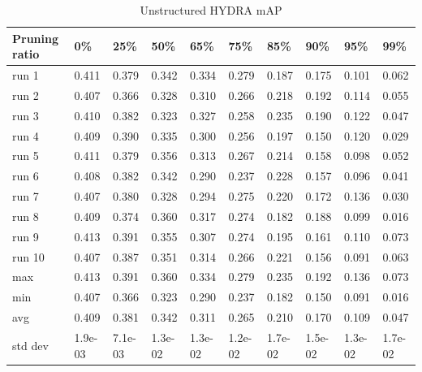 \documentclass[journal,onecolumn,12pt]{IEEEtran}
\begin{document}
\begin{table}[htbp]
    \caption{Unstructured HYDRA mAP}
    \begin{center}
    \begin{tabular}{ |p{2cm}|p{1cm}|p{1cm}|p{1cm}|p{1cm}|p{1cm}|p{1cm}|p{1cm}|p{1cm}|p{1cm}|  }
     \hline
     Pruning ratio  & 0\% & 25\%& 50\%& 65\%& 75\%& 85\%& 90\%& 95\%& 99\%\\
     \hline
        run 1&0.411&0.379&0.342&0.334&0.279&0.187&0.175&0.101&0.062\\
        run 2&0.407&0.366&0.328&0.310&0.266&0.218&0.192&0.114&0.055\\
        run 3&0.410&0.382&0.323&0.327&0.258&0.235&0.190&0.122&0.047\\
        run 4&0.409&0.390&0.335&0.300&0.256&0.197&0.150&0.120&0.029\\
        run 5&0.411&0.379&0.356&0.313&0.267&0.214&0.158&0.098&0.052\\
        run 6&0.408&0.382&0.342&0.290&0.237&0.228&0.157&0.096&0.041\\
        run 7&0.407&0.380&0.328&0.294&0.275&0.220&0.172&0.136&0.030\\
        run 8&0.409&0.374&0.360&0.317&0.274&0.182&0.188&0.099&0.016\\
        run 9&0.413&0.391&0.355&0.307&0.274&0.195&0.161&0.110&0.073\\
        run 10&0.407&0.387&0.351&0.314&0.266&0.221&0.156&0.091&0.063\\
     \hline
        max     &0.413&0.391&0.360&0.334&0.279&0.235&0.192&0.136&0.073\\
        min     &0.407&0.366&0.323&0.290&0.237&0.182&0.150&0.091&0.016\\
        avg     &0.409&0.381&0.342&0.311&0.265&0.210&0.170&0.109&0.047\\
        std dev &1.9e-03&7.1e-03&1.3e-02&1.3e-02&1.2e-02&1.7e-02&1.5e-02&1.3e-02&1.7e-02\\
     \hline
    \end{tabular}
    \end{center}
    \label{tab:a2}
\end{table}
\end{document}
